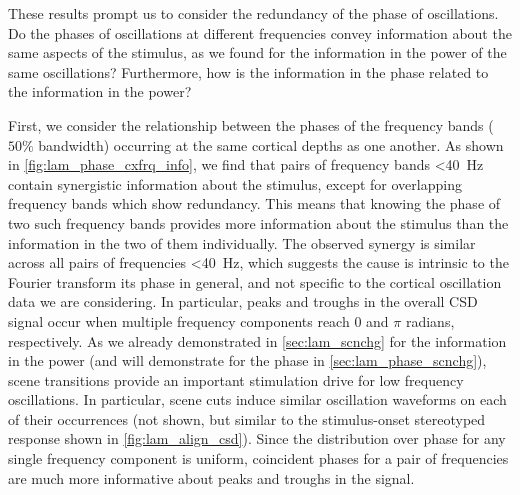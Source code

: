 These results prompt us to consider the redundancy of the phase of oscillations.
Do the phases of oscillations at different frequencies convey information about the same aspects of the stimulus, as we found for the information in the power of the same oscillations?
Furthermore, how is the information in the phase related to the information in the power?

First, we consider the relationship between the phases of the frequency bands ($50\%$ bandwidth) occurring at the same cortical depths as one another.
As shown in \autoref{fig:lam_phase_cxfrq_info}, we find that pairs of frequency bands \SI{<40}{Hz} contain synergistic information about the stimulus, except for overlapping frequency bands which show redundancy.
This means that knowing the phase of two such frequency bands provides more information about the stimulus than the information in the two of them individually.
The observed synergy is similar across all pairs of frequencies \SI{<40}{Hz}, which suggests the cause is intrinsic to the Fourier transform its phase in general, and not specific to the cortical oscillation data we are considering.
In particular, peaks and troughs in the overall \ac{CSD} signal occur when multiple frequency components reach $0$ and $\pi$ radians, respectively.
As we already demonstrated in \autoref{sec:lam_scnchg} for the information in the power (and will demonstrate for the phase in \autoref{sec:lam_phase_scnchg}), scene transitions provide an important stimulation drive for low frequency oscillations.
In particular, scene cuts induce similar oscillation waveforms on each of their occurrences (not shown, but similar to the stimulus-onset stereotyped response shown in \autoref{fig:lam_align_csd}).
Since the distribution over phase for any single frequency component is uniform, coincident phases for a pair of frequencies are much more informative about peaks and troughs in the signal.
%
%
%

